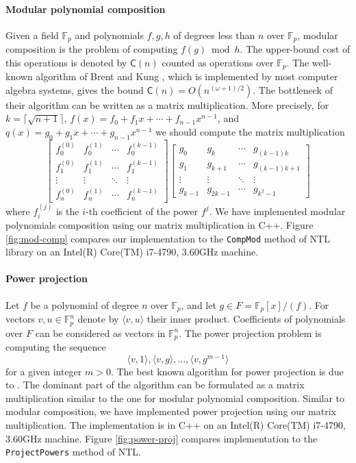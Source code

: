 \documentclass[acmtoms]{acmsmall}
\def\F{\mathbb{F}}
\def\C{\mathsf{C}}
\begin{document}
\paragraph{Modular polynomial composition}
Given a field $\F_p$ and polynomials $f, g, h$ of degrees less than $n$ over $\F_p$, modular 
composition is the problem of computing $f(g) \bmod h$. The upper-bound cost of this operations is 
denoted by $\C(n)$ counted as operations over $\F_p$. The well-known algorithm of Brent and Kung 
\cite{BrKu78}, which is implemented by most computer algebra systems, gives the bound $\C(n) = 
O(n^{(\omega+1)/2})$. The bottleneck of their algorithm can be written as a matrix multiplication. 
More precisely, for $k = \lceil \sqrt{n + 1} \rceil$, $f(x) = f_0 + f_1x + \cdots + f_{n - 1}x^{n - 
1}$, and $q(x) = g_0 + g_1x + \cdots + g_{n - 1}x^{n - 1}$ we should compute the matrix 
multiplication
\[
\renewcommand{\arraystretch}{1.5}
\begin{bmatrix}
	f_0^{(0)} & f_0^{(1)} & \cdots & f_0^{(k - 1)} \\
	f_1^{(0)} & f_1^{(1)} & \cdots & f_1^{(k - 1)} \\
	\vdots  & \vdots  & \ddots & \vdots  \\
	f_n^{(0)} & f_n^{(1)} & \cdots & f_n^{(k - 1)}
\end{bmatrix}
\begin{bmatrix}
	g_0 & g_k & \cdots & g_{(k - 1)k} \\
	g_1 & g_{k + 1} & \cdots & g_{(k - 1)k + 1} \\
	\vdots  & \vdots  & \ddots & \vdots  \\
	g_{k - 1} & g_{2k - 1} & \cdots & g_{k^2 - 1}
\end{bmatrix}
\]
where $f_i^{(j)}$ is the $i$-th coefficient of the power $f^j$. We have implemented modular 
polynomials composition using our matrix multiplication in C++. Figure \ref{fig:mod-comp} compares 
our implementation to the \verb|CompMod| method of NTL library \cite{ntl2015} on an Intel(R) 
Core(TM) i7-4790, 3.60GHz machine.

\paragraph{Power projection}
Let $f$ be a polynomial of degree $n$ over $\F_p$, and let $g \in F = \F_p[x] / (f)$. For vectors 
$v, u \in \F_p^n$ denote by $\langle v, u \rangle$ their inner product. Coefficients of polynomials 
over $F$ can be considered as vectors in $\F_p^n$. The power projection problem is computing the 
sequence
\[ \langle v, 1\rangle, \langle v, g\rangle , \dots, \langle v, g^{m - 1} \rangle \]
for a given integer $m > 0$. The best known algorithm for power projection is due to 
\cite{Shoup1999}. The dominant part of the algorithm can be formulated as a matrix multiplication 
similar to the one for modular polynomial composition. Similar to modular composition, we have 
implemented power projection using our matrix multiplication. The implementation is in C++ on an 
Intel(R) Core(TM) i7-4790, 3.60GHz machine. Figure \ref{fig:power-proj} compares implementation to 
the \verb|ProjectPowers| method of NTL. 
\end{document}
